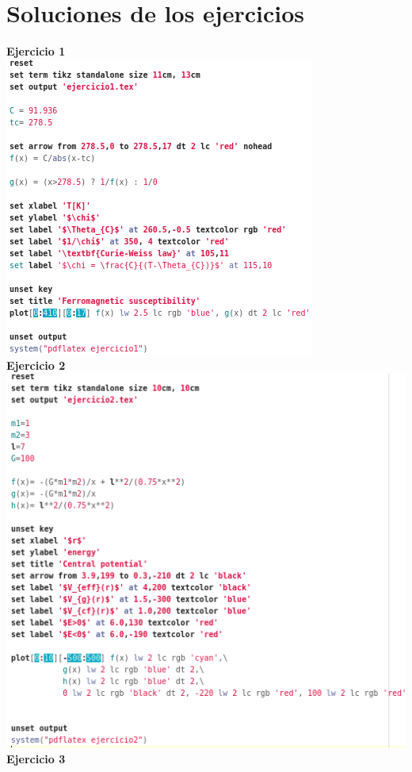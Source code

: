 \documentclass[11.5pt,a4paper]{article}
\begin{document}
\newpage

\section{Soluciones de los ejercicios}

\textbf{Ejercicio 1}\\

\includegraphics[scale=0.75]{screen13.png}\\

\textbf{Ejercicio 2}\\

\includegraphics[scale=0.75]{screen14.png}\\
\newpage
\textbf{Ejercicio 3}\\
\end{document}
